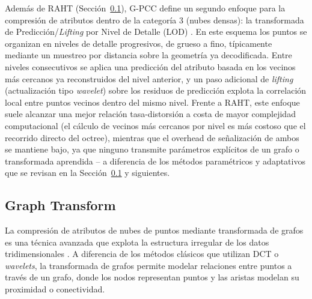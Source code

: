         Además de RAHT (Sección~\ref{sec:pcac_geometric}), G-PCC define un segundo enfoque
        para la compresión de atributos dentro de la categoría 3 (nubes densas): la
        transformada de Predicción/\textit{Lifting} por Nivel de Detalle (LOD)
        \cite{graziosi2020overview}. En este esquema los puntos se organizan en niveles de
        detalle progresivos, de grueso a fino, típicamente mediante un muestreo por
        distancia sobre la geometría ya decodificada. Entre niveles consecutivos se aplica
        una predicción del atributo basada en los vecinos más cercanos ya reconstruidos del
        nivel anterior, y un paso adicional de \textit{lifting} (actualización tipo
        \textit{wavelet}) sobre los residuos de predicción explota la correlación local
        entre puntos vecinos dentro del mismo nivel. Frente a RAHT, este enfoque suele
        alcanzar una mejor relación tasa-distorsión a costa de mayor complejidad
        computacional (el cálculo de vecinos más cercanos por nivel es más costoso que el
        recorrido directo del octree), mientras que el overhead de señalización de ambos
        se mantiene bajo, ya que ninguno transmite parámetros explícitos de un grafo o
        transformada aprendida -- a diferencia de los métodos paramétricos y adaptativos
        que se revisan en la Sección~\ref{sec:pcac_geometric} y siguientes.

    \subsection{Graph Transform}\label{sec:pcac_geometric}
        La compresión de atributos de nubes de puntos mediante transformada de grafos es
        una técnica avanzada que explota la estructura irregular de los datos
        tridimensionales \cite{zhang2014point,pavez2020region}. A diferencia de los
        métodos clásicos que utilizan DCT o \textit{wavelets}, la transformada de grafos
        permite modelar relaciones entre puntos a través de un grafo, donde los nodos
        representan puntos y las aristas modelan su proximidad o conectividad.\\

